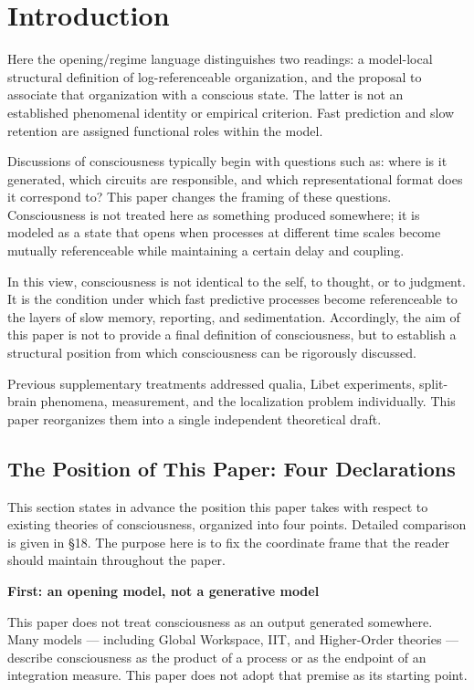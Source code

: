 \section{Introduction}

Here the opening/regime language distinguishes two readings: a model-local structural definition of log-referenceable organization, and the proposal to associate that organization with a conscious state. The latter is not an established phenomenal identity or empirical criterion. Fast prediction and slow retention are assigned functional roles within the model.


Discussions of consciousness typically begin with questions such as: where is it generated, which circuits are responsible, and which representational format does it correspond to? This paper changes the framing of these questions. Consciousness is not treated here as something produced somewhere; it is modeled as a state that opens when processes at different time scales become mutually referenceable while maintaining a certain delay and coupling.

In this view, consciousness is not identical to the self, to thought, or to judgment. It is the condition under which fast predictive processes become referenceable to the layers of slow memory, reporting, and sedimentation. Accordingly, the aim of this paper is not to provide a final definition of consciousness, but to establish a structural position from which consciousness can be rigorously discussed.

Previous supplementary treatments addressed qualia, Libet experiments, split-brain phenomena, measurement, and the localization problem individually. This paper reorganizes them into a single independent theoretical draft.

\subsection{The Position of This Paper: Four Declarations}


This section states in advance the position this paper takes with respect to existing theories of consciousness, organized into four points. Detailed comparison is given in §18. The purpose here is to fix the coordinate frame that the reader should maintain throughout the paper.

\textbf{First: an opening model, not a generative model}

This paper does not treat consciousness as an output generated somewhere. Many models — including Global Workspace, IIT, and Higher-Order theories — describe consciousness as the product of a process or as the endpoint of an integration measure. This paper does not adopt that premise as its starting point.

